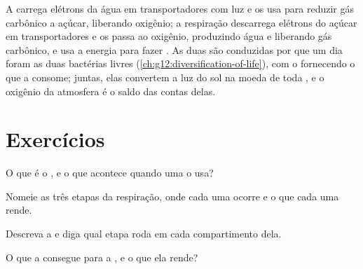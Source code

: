 \begin{remark}\label{rem:g12:respiration-fermentation:mirror}
A  carrega elétrons da água em transportadores com luz e os
usa para reduzir gás carbônico a açúcar, liberando oxigênio; a
respiração descarrega elétrons do açúcar em transportadores e os passa
ao oxigênio, produzindo água e liberando gás carbônico, e usa a energia
para fazer . As duas são conduzidas por  que um dia foram
as duas bactérias livres (\cref{ch:g12:diversification-of-life}), com o
 fornecendo o que a  consome; juntas, elas
convertem a luz do sol na moeda de toda , e o oxigênio da
atmosfera é o saldo das contas delas.
\end{remark}

\section{Exercícios}

\begin{exercise}[$\star$]\label{exo:g12:respiration-fermentation:1}
O que é o , e o que acontece quando uma  o usa?
\end{exercise}

\begin{exercise}[$\star$]\label{exo:g12:respiration-fermentation:2}
Nomeie as três etapas da respiração, onde cada uma ocorre e o que cada
uma rende.
\end{exercise}

\begin{exercise}[$\star$]\label{exo:g12:respiration-fermentation:3}
Descreva a  e diga qual etapa roda em cada compartimento
dela.
\end{exercise}

\begin{exercise}[$\star$]\label{exo:g12:respiration-fermentation:4}
O que a  consegue para a , e o que ela rende?
\end{exercise}

